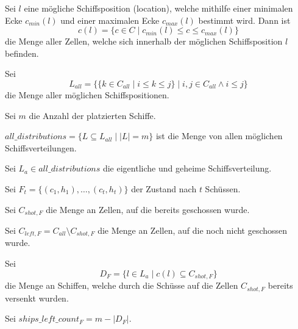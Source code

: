 \documentclass[a4paper,12pt]{llncs}
\numberwithin{equation}{section}
\begin{document}
\begin{definition}
Sei $l$ eine mögliche Schiffsposition (location), welche mithilfe einer minimalen Ecke $c_{min}(l)$ und einer maximalen Ecke $c_{max}(l)$ bestimmt wird. Dann ist
\[
c(l)=
\{
c
\in
C
\mid
c_{min}(l) \leq c \leq c_{max}(l)
\}
\]
die Menge aller Zellen, welche sich innerhalb der möglichen Schiffsposition $l$ befinden.
\end{definition}

\begin{definition}
Sei 
\[
L_{all}=
\{
\{
k
\in
C_{all}
\mid
i \leq k \leq j
\}
\mid
i,j \in C_{all}
\wedge
i \leq j
\}
\] die Menge aller möglichen Schiffspositionen.
\end{definition}

\begin{definition}
Sei $m$ die Anzahl der platzierten Schiffe.
\end{definition}

\begin{definition}
$all\_distributions=\{L \subseteq L_{all} \mid |L|=m\}$ ist die Menge von allen möglichen Schiffsverteilungen.
\end{definition}

\begin{definition}
Sei $L_a \in all\_distributions$ die eigentliche und geheime Schiffsverteilung.
\end{definition}

\begin{definition}
Sei $F_t=\{(c_1, h_1), \dots , (c_t, h_t)\}$ der Zustand nach $t$ Schüssen.
\end{definition}

\begin{definition}
Sei $C_{shot,F}$ die Menge an Zellen, auf die bereits geschossen wurde.
\end{definition}

\begin{definition}
Sei $C_{left,F}=C_{all} \setminus C_{shot,F}$ die Menge an Zellen, auf die noch nicht geschossen wurde.
\end{definition}

\begin{definition}
Sei
\[
D_F=\{l \in L_a \mid c(l) \subseteq C_{shot,F}\}
\]
die Menge an Schiffen, welche durch die Schüsse auf die Zellen $C_{shot,F}$ bereits versenkt wurden.
\end{definition}

\begin{definition}
Sei $ships\_left\_count_F=m - |D_F|$.
\end{definition}
\end{document}
